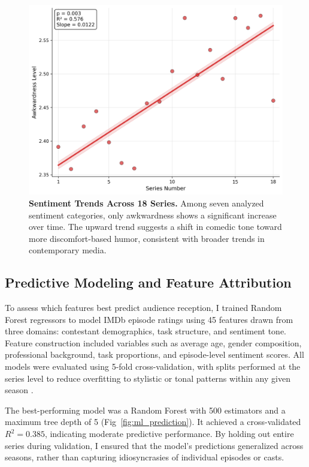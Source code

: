 \documentclass[10pt,letterpaper]{article}
\begin{document}
\begin{figure}[!h]
\centering
\includegraphics[width=\linewidth]{FiguresPNG/Fig9.png}
\caption{{\bf Sentiment Trends Across 18 Series.}
Among seven analyzed sentiment categories, only awkwardness shows a significant increase over time. The upward trend suggests a shift in comedic tone toward more discomfort-based humor, consistent with broader trends in contemporary media.}
\label{fig:sentiment_trends}
\end{figure}
\FloatBarrier



\subsection*{Predictive Modeling and Feature Attribution}

To assess which features best predict audience reception, I trained Random Forest regressors to model IMDb episode ratings using 45 features drawn from three domains: contestant demographics, task structure, and sentiment tone. Feature construction included variables such as average age, gender composition, professional background, task proportions, and episode-level sentiment scores. All models were evaluated using 5-fold cross-validation, with splits performed at the series level to reduce overfitting to stylistic or tonal patterns within any given season \cite{Arlot2010}.

The best-performing model was a Random Forest with 500 estimators and a maximum tree depth of 5 \cite{Breiman2001} (Fig~\ref{fig:ml_prediction}). It achieved a cross-validated $R^2 = 0.385$, indicating moderate predictive performance. By holding out entire series during validation, I ensured that the model's predictions generalized across seasons, rather than capturing idiosyncrasies of individual episodes or casts.
\end{document}
